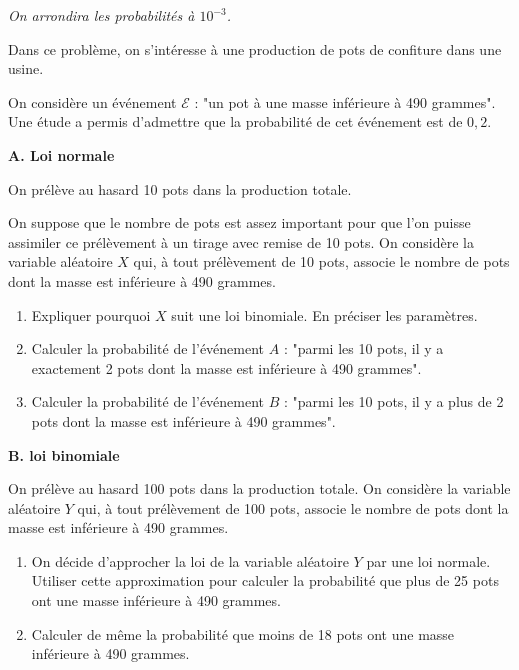 	\begin{exercice_cours}[\quad]{}

\emph{On arrondira les probabilités à $10^{-3}$.}

Dans ce problème, on s'intéresse à une production de pots de confiture dans une usine.

On considère un événement $\mathcal{E}$ : "un pot à une masse inférieure à 490 grammes". Une étude a permis d'admettre que la probabilité de cet événement est de $0,2$.


\medskip

\textbf{A. Loi normale}

\medskip

On prélève au hasard 10 pots dans la production totale.

On suppose que le nombre de pots est assez important pour que l'on puisse assimiler ce prélèvement à un tirage avec remise de 10 pots. On considère la variable aléatoire $X$ qui, à tout prélèvement de 10 pots, associe le nombre de pots dont la masse est inférieure à 490 grammes.

	\begin{enumerate}
		\item Expliquer pourquoi $X$ suit une loi binomiale. En préciser les paramètres.
		\item Calculer la probabilité de l'événement $A$ : "parmi les 10 pots, il y a exactement 2 pots dont la masse est inférieure à 490 grammes".
		\item Calculer la probabilité de l'événement $B$ : "parmi les 10 pots, il y a plus de 2 pots dont la masse est inférieure à 490 grammes".
	\end{enumerate}


\medskip

\textbf{B. loi binomiale}
\medskip

On prélève au hasard 100 pots dans la production totale. On considère la variable aléatoire $Y$ qui, à tout prélèvement de 100 pots, associe le nombre de pots dont la masse est inférieure à 490 grammes.

\begin{enumerate}
	\item On décide d'approcher la loi de la variable aléatoire $Y$ par une loi normale. Utiliser cette approximation pour calculer la probabilité que plus de 25 pots ont une masse inférieure à 490 grammes.
	\item Calculer de même la probabilité que moins de 18 pots ont une masse inférieure à 490 grammes.

\end{enumerate}

	\end{exercice_cours}
